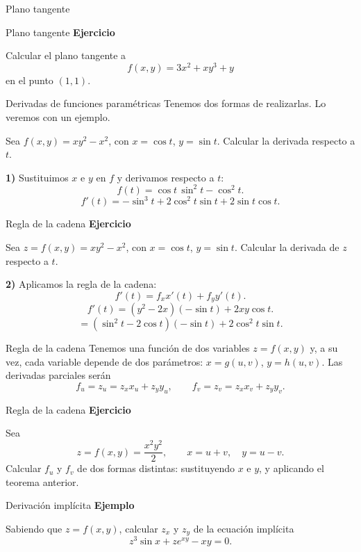 \documentclass[main.tex]{subfiles}
\begin{document}
\begin{frame}{Plano tangente}
\end{frame}
\begin{frame}{Plano tangente}
\textbf{Ejercicio}\par Calcular el plano tangente a\[f(x,y)=3x^2+xy^3+y\]
en el punto $(1,1)$.
\end{frame}
\begin{frame}{Derivadas de funciones paramétricas}
\small Tenemos dos formas de realizarlas. Lo veremos con un ejemplo.
\medskip

Sea $f(x,y)=xy^2-x^2$, con $x=\cos t$, $y=\sin t$. Calcular la derivada respecto a $t$.
\medskip

\textbf{1)} Sustituimos $x$ e $y$ en $f$ y derivamos respecto a $t$:
\[f(t)=\cos t\,\sin^2t-\cos^2t.\]
\[f'(t)=-\sin^3t+2\cos^2t\sin t+2\sin t\cos t.\]
\end{frame}
\begin{frame}{Regla de la cadena}
\small\textbf{Ejercicio}\par Sea $z=f(x,y)=xy^2-x^2$, con $x=\cos t$, $y=\sin t$. Calcular la derivada de $z$ respecto a $t$.
\medskip

\textbf{2)} Aplicamos la regla de la cadena:
\[f'(t)=f_xx'(t)+f_yy'(t).\]
\[f'(t)=(y^2-2x)(-\sin t)+2xy\cos t.\]
\[=(\sin^2t-2\cos t)(-\sin t)+2\cos^2t\sin t.\]
\end{frame}
\begin{frame}{Regla de la cadena}
\small Tenemos una función de dos variables $z=f(x,y)$ y, a su vez, cada variable depende de dos parámetros: $x=g(u,v)$, $y=h(u,v)$. Las derivadas parciales serán
\[f_u=z_u=z_xx_u+z_yy_u,\qquad f_v=z_v=z_xx_v+z_yy_v.\]
\end{frame}
\begin{frame}{Regla de la cadena}
\textbf{Ejercicio}\par Sea
\[z=f(x,y)=\frac{x^2y^2}{2},\qquad x=u+v,\quad y=u-v.\]
Calcular $f_u$ y $f_v$ de dos formas distintas: sustituyendo $x$ e $y$, y aplicando el teorema anterior.
\end{frame}
\begin{frame}{Derivación implícita}
\textbf{Ejemplo}\par Sabiendo que $z=f(x,y)$, calcular $z_x$ y $z_y$ de la ecuación implícita
\[z^3\sin x+ze^{xy}-xy=0.\]
\end{frame}
\end{document}
